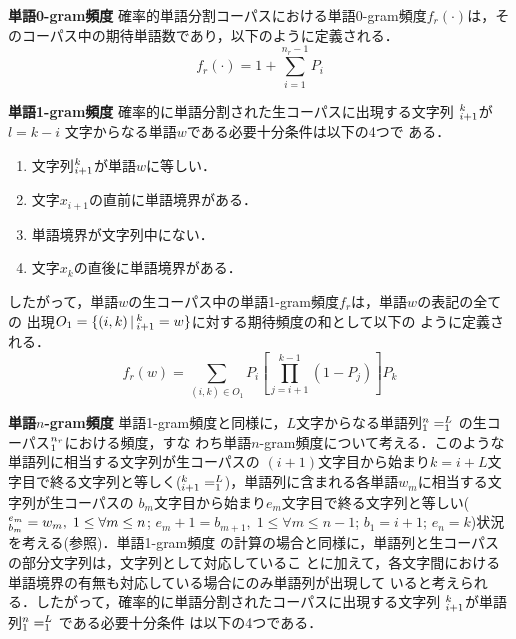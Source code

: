 \begin{list}{}{}

\item[\textbf{単語0-gram頻度}] 確率的単語分割コーパスにおける単語0-gram頻度$f_{r}
  (\cdot)$は，そのコーパス中の期待単語数であり，以下のように定義される．
  \begin{displaymath}
    f_{r}(\cdot) = 1 + \sum_{i=1}^{n_{r}-1} P_{i}
  \end{displaymath}

\item[\textbf{単語1-gram頻度}] 確率的に単語分割された生コーパスに出現する文字列
  $\Bdma{x}_{i+1}^{k}$が$l = k-i$ 文字からなる単語$w$である必要十分条件は以下の4つで
  ある．
  \begin{enumerate}
  \item 文字列$\Bdma{x}_{i+1}^{k}$が単語$w$に等しい．
  \item 文字$x_{i+1}$の直前に単語境界がある．
  \item 単語境界が文字列中にない．
  \item 文字$x_{k}$の直後に単語境界がある．
  \end{enumerate}
  したがって，単語$w$の生コーパス中の単語1-gram頻度$f_{r}$は，単語$w$の表記の全ての
  出現$O_{1} = \{(i,k)\,|\,\Bdma{x}_{i+1}^{k} = w\}$に対する期待頻度の和として以下の
  ように定義される．
  \begin{displaymath}
    f_{r}(w)
    = \sum_{(i,k) \in O_{1}}P_{i}\left[\prod_{j=i+1}^{k-1}(1-P_{j})\right]P_{k}
  \end{displaymath}

\item[\textbf{単語$n$-gram頻度}] 単語1-gram頻度と同様に，$L$文字からなる単語列$\Bdma{w}
  _{1}^{n} = \Bdma{x'}_{1} ^{L}$ の生コーパス$\Bdma{x}_{1}^{n_{r}}$における頻度，すな
  わち単語$n$-gram頻度について考える．このような単語列に相当する文字列が生コーパスの
  $(i+1)$文字目から始まり$k = i+L$文字目で終る文字列と等しく($\Bdma{x}_{i+1}^{k} =
  \Bdma{x'}_{1}^{L} $)，単語列に含まれる各単語$w_{m}$に相当する文字列が生コーパスの
  $b_{m}$文字目から始まり$e_{m}$文字目で終る文字列と等しい($\Bdma{x}_{b_{m}}^{e_{m}}
  = w_{m},\; 1 \leq \forall m \leq n$; $e_{m}+1=b_{m+1},\; 1 \leq \forall m \leq n-1
  $; $b_{1} = i+1$; $e_{n} = k$)状況を考える(参照)．単語1-gram頻度
  の計算の場合と同様に，単語列と生コーパスの部分文字列は，文字列として対応しているこ
  とに加えて，各文字間における単語境界の有無も対応している場合にのみ単語列が出現して
  いると考えられる．したがって，確率的に単語分割されたコーパスに出現する文字列
  $\Bdma{x}_{i+1}^{k}$が単語列$\Bdma{w}_{1}^{n}=\Bdma{x'}_{1}^{L}$ である必要十分条件
  は以下の4つである．


\end{list}
